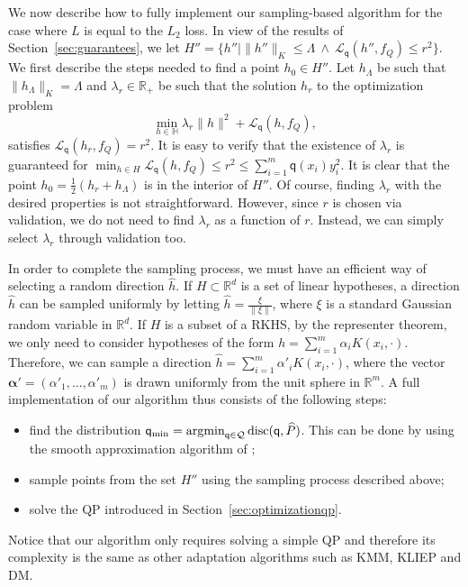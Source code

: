 \documentclass[twoside,11pt]{article}
\def\Rset{\mathbb{R}}
\def\Hset{\mathbb{H}}
\DeclareMathOperator*{\argmin}{\rm argmin}
\newcommand{\h}{\widehat}
\newcommand{\cL}{{\mathcal L}}
\newcommand{\1}{\mat{1}}
\newcommand{\qq}{{\mathsf q}}
\newcommand{\qmin}{{\qq_\text{min}}}
\newcommand{\dis}{\mathrm{disc}}
\begin{document}
We now describe how to fully implement our sampling-based algorithm
for the case where $L$ is equal to the $L_2$ loss.  In view of the
results of Section~\ref{sec:guarantees}, we let
$H'' = \{ h'' |\|h''\|_K \leq \Lambda \ \wedge \ \cL_{\qq}(h'', f_Q)
\leq r^2 \}$. We first describe the steps needed to find a point $h_0
\in H''$.  Let $h_\Lambda$ be such that $\|h_\Lambda\|_K = \Lambda$
and $\lambda_r \in \Rset_+$ be such that the solution $h_r$
 to the optimization problem
\begin{equation*}
 \min_{h \in \Hset} \lambda_r \| h \|^2 + \cL_{\qq}(h, f_Q),
\end{equation*}
satisfies $\cL_{\qq}(h_r, f_Q) = r^2$. It is easy to verify that the
existence of $\lambda_r$ is guaranteed for
$\min_{h \in H } \cL_\qq(h, f_Q) \leq r^2 \leq \sum_{i=1}^m \qq(x_i) y_i^2$.
 It is clear that the point $h_0 = \frac{1}{2} (h_r + h_\Lambda)$ is in
the interior of $H''$. Of course, finding $\lambda_r$ with the desired
properties is not straightforward. However, since $r$ is chosen via
validation, we do not need to find $\lambda_r$ as a function of
$r$. Instead, we can simply select $\lambda_r$ through
validation too.

In order to complete the sampling process, we must have an efficient
way of selecting a random direction $\h h$. If $H \subset \Rset^d$ is
a set of linear hypotheses, a direction $\h h$ can be sampled
uniformly by letting $\h h = \frac{\xi}{\| \xi \|}$, where $\xi$ is a
standard Gaussian random variable in $\Rset^d$. If $H$ is a subset of
a RKHS, by the representer theorem, we only need to consider
hypotheses of the form
$h = \sum_{i=1}^m \alpha_i K(x_i, \cdot)$. Therefore, we can sample a
direction $\h h = \sum_{i=1}^m \alpha'_i K(x_i, \cdot)$, where the
vector $\boldsymbol{\alpha'} = (\alpha'_1, \ldots, \alpha'_m)$ is
drawn uniformly from the unit sphere in $\Rset^m$.  A full
implementation of our algorithm thus consists of the following steps:
\begin{itemize}
\itemsep 0em
\item find the distribution
$\qmin = \argmin_{\qq \in \mathcal{Q}}   \dis(\qq, \h P)$. This can be
done by using the smooth approximation algorithm of
\cite{CortesMohri2013};
\item sample points from the set $H''$ using the sampling process
described above;
\item solve the QP introduced in Section~\ref{sec:optimizationqp}.
\end{itemize}

Notice that our algorithm only requires solving a simple QP and
therefore its complexity is the same as other adaptation algorithms
such as KMM, KLIEP and DM.
\end{document}

